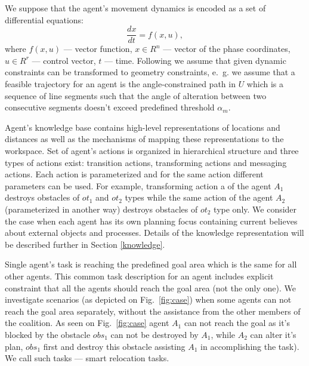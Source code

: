 \documentclass[runningheads,a4paper]{llncs}
\begin{document}
We suppose that the agent's movement dynamics is encoded as a set of differential equations:
\begin{equation}
	\frac{dx}{dt} = f(x,u),
\end{equation}
where $f(x,u)$ --- vector function, $x\in R^n$ --- vector of the phase coordinates, $u\in R^r$ --- control vector, $t$ --- time. Following \cite{Yakovlev2015a} we assume that given dynamic constraints can be transformed to geometry constraints, e.~g. we assume that a feasible trajectory for an agent is the angle-constrained path in $U$ which is a sequence of line segments such that the angle of alteration between two consecutive segments doesn't exceed predefined threshold $\alpha_m$.

Agent's knowledge base contains high-level representations of locations and distances as well as the mechanisms of mapping these representations to the workspace. Set of agent's actions is organized in hierarchical structure and three types of actions exist: transition actions, transforming actions and messaging actions. Each action is parameterized and for the same action different parameters can be used. For example, transforming action a of the agent $A_1$ destroys obstacles of $ot_1$ and $ot_2$ types while the same action of the agent $A_2$ (parameterized in another way) destroys obstacles of $ot_2$ type only. We consider the case when each agent has its own planning focus containing current believes about external objects and processes. Details of the knowledge representation will be described further in Section \ref{knowledge}.

Single agent's task is reaching the predefined goal area which is the same for all other agents. This common task description for an agent includes explicit constraint that all the agents should reach the goal area (not the only one). We investigate scenarios (as depicted on Fig.~\ref{fig:case}) when some agents can not reach the goal area separately, without the assistance from the other members of the coalition. As seen on Fig.~\ref{fig:case} agent $A_1$ can not reach the goal as it's blocked by the obstacle $obs_1$ can not be destroyed by $A_1$, while $A_2$ can alter it's plan, $obs_1$ first and destroy this obstacle assisting $A_1$ in accomplishing the task). We call such tasks --- smart relocation tasks.
\end{document}

